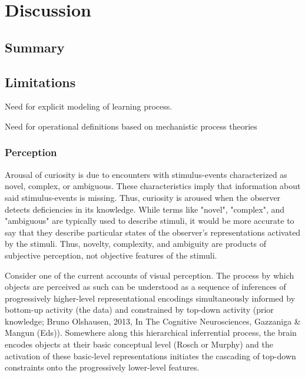 \chapter{Discussion}\label{ch:discussion}


\section{Summary}

\section{Limitations}

Need for explicit modeling of learning process.

Need for operational definitions based on mechanistic process theories

\subsection{Perception}

    Arousal of curiosity is due to encounters with stimulus-events characterized as novel, complex, or ambiguous. These characteristics imply that information about said stimulus-events is missing. Thus, curiosity is aroused when the observer detects deficiencies in its knowledge. While terms like "novel", "complex", and "ambiguous" are typically used to describe stimuli, it would be more accurate to say that they describe particular states of the observer's representations activated by the stimuli. Thus, novelty, complexity, and ambiguity are products of subjective perception, not objective features of the stimuli.

    Consider one of the current accounts of visual perception. The process by which objects are perceived as such can be understood as a sequence of inferences of progressively higher-level representational encodings simultaneously informed by bottom-up activity (the data) and constrained by top-down activity (prior knowledge; Bruno Olshausen, 2013, In The Cognitive Neurosciences, Gazzaniga & Mangun (Eds)). Somewhere along this hierarchical inferrential process, the brain encodes objects at their basic conceptual level (Rosch or Murphy) and the activation of these basic-level representations initiates the cascading of top-down constraints onto the progressively lower-level features.

